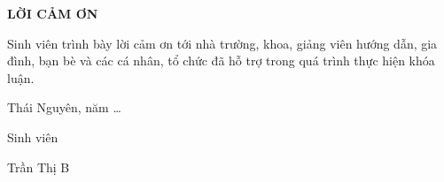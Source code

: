 \vspace*{15pt}
\begin{center}
\large{\textbf{LỜI CẢM ƠN}}
\end{center}



Sinh viên trình bày lời cảm ơn tới nhà trường, khoa, giảng viên hướng dẫn, gia đình, bạn bè và các cá nhân, tổ chức đã hỗ trợ trong quá trình thực hiện khóa luận.

\vspace{1cm}

\begin{flushright}
Thái Nguyên, năm \ldots

Sinh viên

\vspace{2cm}

Trần Thị B
\end{flushright}


